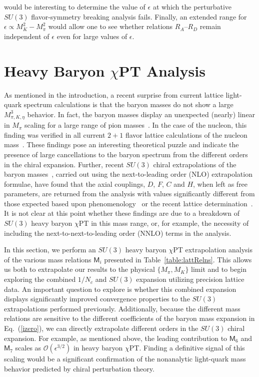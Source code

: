 \documentclass[twocolumn,nofootinbib,prd,aps,superscriptaddress,tightenlines]{revtex4}
\def\mreln{ \mathsf{M} }
\def\eqref#1{{(\ref{#1})}}
\begin{document}
would be interesting to determine the value of $\epsilon$ at which the perturbative $SU(3)$ flavor-symmetry breaking analysis fails.  Finally, an extended range for $\epsilon \propto M_K^2 - M_\pi^2$ would allow one to see whether relations $R_A$--$R_D$ remain independent of $\epsilon$ even for large values of $\epsilon$.



%
\section{Heavy Baryon $\chi$PT Analysis}
%
As mentioned in the introduction, a recent surprise from current lattice light-quark spectrum calculations is that the baryon masses do not show a large $M_{\pi,K,\eta}^3$ behavior.  
In fact, the baryon masses display an unexpected (nearly) linear in $M_\pi$ scaling for a large range of pion masses~\cite{WalkerLoud:2008bp}.  In the case of the nucleon, this finding was verified in all current $2+1$ flavor lattice calculations of the nucleon mass~\cite{WalkerLoud:2008pj}.  These findings pose an interesting theoretical puzzle and indicate the presence of large cancellations to the baryon spectrum from the different orders in the chiral expansion.  Further, recent $SU(3)$ chiral extrapolations of the baryon masses~\cite{WalkerLoud:2008pj,Ishikawa:2009vc}, carried out using the next-to-leading order (NLO) extrapolation formulae, have found that the axial couplings, $D$, $F$, $C$ and $H$, when left as free parameters, are returned from the analysis with values significantly different from those expected based upon phenomenology~\cite{FloresMendieta:1998ii} or the recent lattice determination~\cite{Lin:2007ap}.
It is not clear at this point whether these findings are due to a breakdown of $SU(3)$ heavy baryon $\chi$PT in this mass range, or, for example, the necessity of including the next-to-next-to-leading order (NNLO) terms in the analysis.

In this section, we perform an $SU(3)$ heavy baryon $\chi$PT extrapolation analysis of the various mass relations $\mreln_i$ presented in Table~\ref{table:lattRelns}.  This allows us both to extrapolate our results to the physical $\{M_\pi,M_K\}$ limit and to begin exploring the combined $1/N_c$ and $SU(3)$ expansion utilizing precision lattice data.  An important question to explore is whether this combined expansion displays significantly improved convergence properties to the $SU(3)$ extrapolations performed previously.  Additionally, because the different mass relations are sensitive to the different coefficients of the baryon mass expansion in Eq.~\eqref{izero}, we can directly extrapolate different orders in the $SU(3)$ chiral expansion.  For example, as mentioned above, the leading contribution to $\mreln_6$ and $\mreln_7$ scales as $\mathcal{O}(\epsilon^{3/2})$ in heavy baryon $\chi$PT.  Finding a definitive signal of this scaling would be a significant confirmation of the nonanalytic light-quark mass behavior predicted by chiral perturbation theory.
\end{document}
